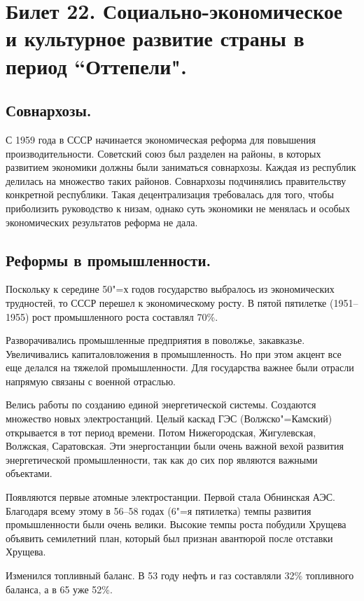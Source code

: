 \section{Билет 22. Социально-экономическое и культурное развитие страны в период “Оттепели".}

\subsection{Совнархозы.}

С 1959 года в СССР начинается экономическая реформа для повышения производительности. Советский союз был разделен на районы, в которых развитием экономики должны были заниматься совнархозы. Каждая из республик делилась на множество таких районов. Совнархозы подчинялись правительству конкретной республики. Такая децентрализация требовалась для того, чтобы приболизить руководство к низам, однако суть экономики не менялась и особых экономических результатов реформа не дала.

\subsection{Реформы в промышленности.}

Поскольку к середине 50"=х годов государство выбралось из экономических трудностей, то СССР перешел к экономическому росту. В пятой пятилетке (1951--1955) рост промышленного роста составлял 70\%. 

Разворачивались промышленные предприятия в поволжье, закавказье. Увеличивались капиталовложения в промышленность. Но при этом акцент все еще делался на тяжелой промышленности. Для государства важнее были отрасли напрямую связаны с военной отраслью. 

Велись работы по созданию единой энергетической системы. Создаются множество новых электростанций. Целый каскад ГЭС (Волжско"=Камский) открывается в тот период времени. Потом Нижегородская, Жигулевская, Волжская, Саратовская. Эти энергостанции были очень важной вехой развития энергетической промышленности, так как до сих пор являются важными объектами. 

Появляются первые атомные электростанции. Первой стала Обнинская АЭС. Благодаря всему этому в 56--58 годах (6"=я пятилетка) темпы развития промышленности были очень велики. Высокие темпы роста побудили Хрущева объявить семилетний план, который был признан авантюрой после отставки Хрущева.

Изменился топливный баланс. В 53 году нефть и газ составляли 32\% топливного баланса, а в 65 уже 52\%. 

